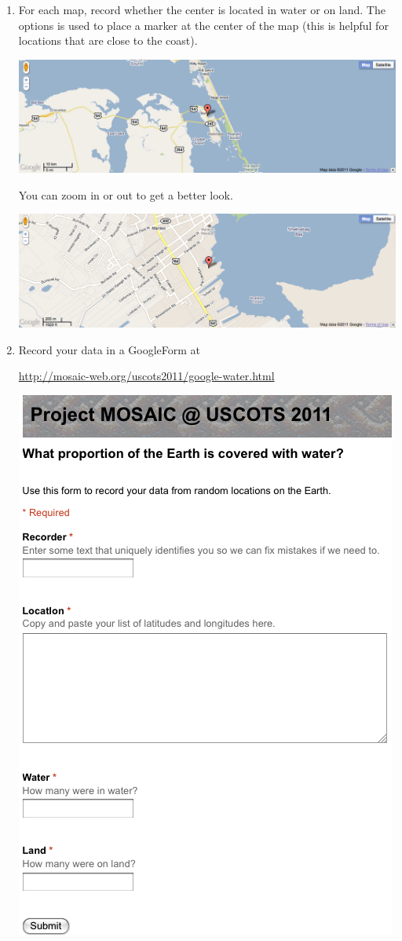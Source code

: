 \begin{enumerate}
\item
For each map, record whether the center is located in water or on land.  The options 
is used to place a marker at the center of the map (this is helpful for locations that are close to 
the coast).  
\begin{center}
\includegraphics[width=.8\textwidth]{images/google-water1}
\end{center}
You can zoom in or out to get a better look.
\begin{center}
\includegraphics[width=.8\textwidth]{images/google-water2}
\end{center}


\item
Record your data in a GoogleForm at 

\begin{center}
\url{http://mosaic-web.org/uscots2011/google-water.html}

\includegraphics[width=.4\textwidth]{images/googleForm-water}
\end{center}


\end{enumerate}
